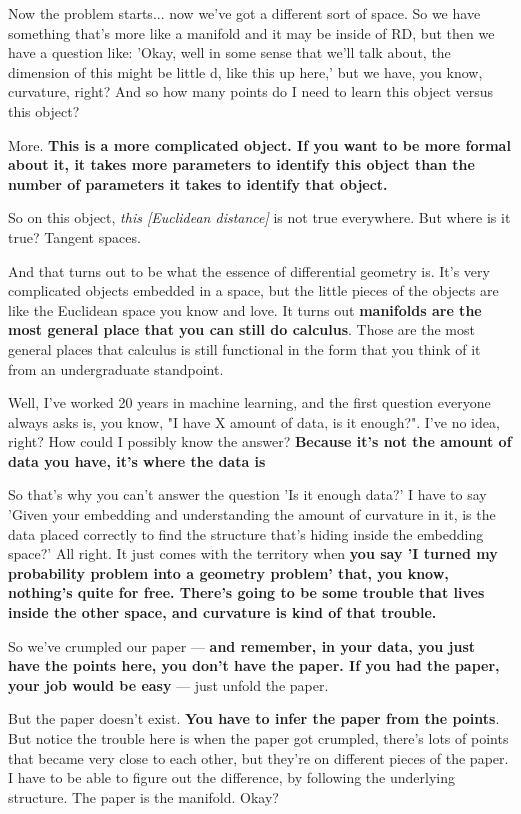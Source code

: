 Now the problem starts... now we've got a different sort of space. So we have something that's more like a manifold and it may be inside of RD, but then we have a question like: 'Okay, well in some sense that we'll talk about, the dimension of this might be little d, like this up here,' but we have, you know, curvature, right? And so how many points do I need to learn this object versus this object? 

More. \textbf{This is a more complicated object. If you want to be more formal about it, it takes more parameters to identify this object than the number of parameters it takes to identify that object.}

So on this object, \textit{this [Euclidean distance]} is not true everywhere. But where is it true? Tangent spaces.

And that turns out to be what the essence of differential geometry is. It's very complicated objects embedded in a space, but the little pieces of the objects are like the Euclidean space you know and love. It turns out \textbf{manifolds are the most general place that you can still do calculus}. Those are the most general places that calculus is still functional in the form that you think of it from an undergraduate standpoint. 


Well, I've worked 20 years in machine learning, and the first question everyone always asks is, you know, "I have X amount of data, is it enough?". I've no idea, right? How could I possibly know the answer? \textbf{Because it's not the amount of data you have, it's where the data is}

So that's why you can't answer the question 'Is it enough data?' I have to say 'Given your embedding and understanding the amount of curvature in it, is the data placed correctly to find the structure that's hiding inside the embedding space?' All right. It just comes with the territory when \textbf{you say 'I turned my probability problem into a geometry problem' that, you know, nothing's quite for free. There's going to be some trouble that lives inside the other space, and curvature is kind of that trouble.}


\medskip \noindent 

So we've crumpled our paper — \textbf{and remember, in your data, you just have the points here, you don't have the paper. If you had the paper, your job would be easy} — just unfold the paper. 

But the paper doesn't exist. \textbf{You have to infer the paper from the points}. But notice the trouble here is when the paper got crumpled, there's lots of points that became very close to each other, but they're on different pieces of the paper. I have to be able to figure out the difference, by following the underlying structure. The paper is the manifold. Okay? 

